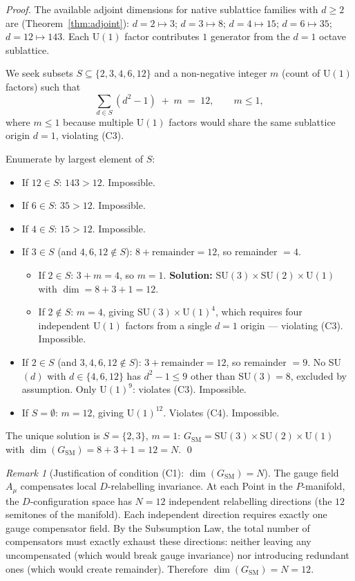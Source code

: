 \documentclass[11pt,a4paper]{article}
\theoremstyle{definition}
\theoremstyle{remark}
\newtheorem{remark}[theorem]{Remark}
\begin{document}
\begin{proof}
The available adjoint dimensions for native sublattice families with $d \ge 2$ are (Theorem~\ref{thm:adjoint}): $d=2 \mapsto 3$; $d=3 \mapsto 8$; $d=4 \mapsto 15$; $d=6 \mapsto 35$; $d=12 \mapsto 143$. Each $\mathrm{U}(1)$ factor contributes $1$ generator from the $d=1$ octave sublattice.

We seek subsets $S \subseteq \{2,3,4,6,12\}$ and a non-negative integer $m$ (count of $\mathrm{U}(1)$ factors) such that
\[
\sum_{d \in S}(d^{2}-1) \;+\; m \;=\; 12, \qquad m \le 1,
\]
where $m \le 1$ because multiple $\mathrm{U}(1)$ factors would share the same sublattice origin $d=1$, violating (C3).

Enumerate by largest element of $S$:
\begin{itemize}[leftmargin=*]
\item If $12 \in S$: $143 > 12$. Impossible.
\item If $6 \in S$: $35 > 12$. Impossible.
\item If $4 \in S$: $15 > 12$. Impossible.
\item If $3 \in S$ (and $4,6,12 \notin S$): $8 + \text{remainder} = 12$, so remainder $= 4$.
  \begin{itemize}
  \item If $2 \in S$: $3 + m = 4$, so $m = 1$. \textbf{Solution:} $\mathrm{SU}(3) \times \mathrm{SU}(2) \times \mathrm{U}(1)$ with $\dim = 8 + 3 + 1 = 12$. \checkmark
  \item If $2 \notin S$: $m = 4$, giving $\mathrm{SU}(3) \times \mathrm{U}(1)^{4}$, which requires four independent $\mathrm{U}(1)$ factors from a single $d=1$ origin --- violating (C3). Impossible.
  \end{itemize}
\item If $2 \in S$ (and $3,4,6,12 \notin S$): $3 + \text{remainder} = 12$, so remainder $= 9$. No SU$(d)$ with $d \in \{4,6,12\}$ has $d^{2}-1 \le 9$ other than SU$(3) = 8$, excluded by assumption. Only $\mathrm{U}(1)^{9}$: violates (C3). Impossible.
\item If $S = \emptyset$: $m = 12$, giving $\mathrm{U}(1)^{12}$. Violates (C4). Impossible.
\end{itemize}
The unique solution is $S = \{2,3\}$, $m = 1$: $G_{\mathrm{SM}} = \mathrm{SU}(3) \times \mathrm{SU}(2) \times \mathrm{U}(1)$ with $\dim(G_{\mathrm{SM}}) = 8+3+1 = 12 = N$. \qed
\end{proof}

\begin{remark}[Justification of condition (C1): $\dim(G_{\mathrm{SM}}) = N$]
The gauge field $A_{\mu}$ compensates local $D$-relabelling invariance. At each Point in the $P$-manifold, the $D$-configuration space has $N = 12$ independent relabelling directions (the $12$ semitones of the manifold). Each independent direction requires exactly one gauge compensator field. By the Subsumption Law, the total number of compensators must exactly exhaust these directions: neither leaving any uncompensated (which would break gauge invariance) nor introducing redundant ones (which would create remainder). Therefore $\dim(G_{\mathrm{SM}}) = N = 12$.
\end{remark}
\end{document}
